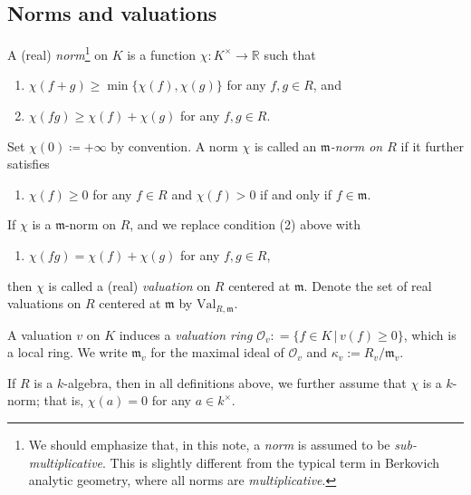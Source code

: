 \documentclass[11pt, leqno]{amsart}%
\theoremstyle{plain}
\theoremstyle{definition}
\newtheorem{definition}[theorem]{Definition}
\theoremstyle{remark}
\newcommand{\cO}{\mathcal{O}}
\newcommand{\bR}{\mathbb{R}}
\newcommand{\fm}{\mathfrak{m}}
\newcommand{\Val}{\mathrm{Val}}
\begin{document}
\subsection{Norms and valuations}

	A (real) \emph{norm}\footnote{We should emphasize that, in this note, a \emph{norm} is assumed to be \emph{sub-multiplicative}. This is slightly different from the typical term in Berkovich analytic geometry, where all norms are \emph{multiplicative}.} on $K$ is a function $\chi:K^\times\to \bR$ such that 
	\begin{enumerate}
			
		\item $\chi(f+g)\ge \min\{\chi(f),\chi(g)\}$ for any $f,g\in R$, and
		
		\item $\chi(fg)\ge \chi(f)+\chi(g)$ for any $f,g\in R$. 
    \end{enumerate} 

    Set $\chi(0)\coloneqq +\infty$ by convention.
    A norm $\chi$ is called an \emph{$\fm$-norm on $R$} if it further satisfies
    \begin{enumerate}
        \item[(3)] $\chi(f)\ge 0$ for any $f\in R$ and $\chi(f)>0$ if and only if $f\in\fm$. 
    \end{enumerate}
	
    If $\chi$ is a $\fm$-norm on $R$, and we replace condition (2) above with
    \begin{enumerate}
        \item[(2')] $\chi(fg)=\chi(f)+\chi(g)$ for any $f,g\in R$,
    \end{enumerate}
    then $\chi$ is called a (real) \emph{valuation} on $R$ centered at $\fm$. 
    Denote the set of real valuations on $R$ centered at $\fm$ by $\Val_{R,\fm}$. 


A valuation $v$ on $K$ induces a \emph{valuation ring} $\cO_{v} : = \{ f \in K \, \vert \, v(f) \geq 0\}$, which is a local ring.
We write $\fm_v$ for the maximal ideal of $\cO_v$ and $\kappa_{v}:=R_v/\fm_v$.

If $R$ is a $k$-algebra, then in all definitions above, we further assume that $\chi$ is a $k$-norm; that is, $\chi(a)=0$ for any $a\in k^\times$. 
\end{document}
